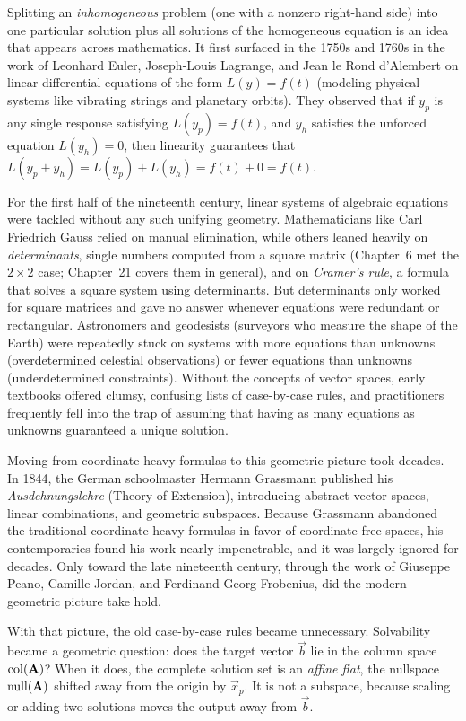 \begin{historybox}
Splitting an \emph{inhomogeneous} problem (one with a nonzero right-hand side) into one
particular solution plus all solutions of the homogeneous equation is an idea that appears
across mathematics. It first surfaced
in the 1750s and 1760s in the work of Leonhard Euler, Joseph-Louis Lagrange, and Jean le Rond
d'Alembert on linear differential equations of the form $L(y) = f(t)$ (modeling physical systems
like vibrating strings and planetary orbits). They observed that if $y_p$ is any single response
satisfying $L(y_p) = f(t)$, and $y_h$ satisfies the unforced equation $L(y_h) = 0$, then linearity
guarantees that $L(y_p + y_h) = L(y_p) + L(y_h) = f(t) + 0 = f(t)$.

For the first half of the nineteenth century, linear systems of algebraic equations were tackled
without any such unifying geometry. Mathematicians like Carl Friedrich Gauss relied on manual
elimination, while others leaned heavily on \emph{determinants}, single numbers computed
from a square matrix (Chapter~6 met the $2\times 2$ case; Chapter~21 covers them in general), and on \emph{Cramer's rule}, a formula
that solves a square system using determinants. But determinants
only worked for square matrices and gave no answer whenever equations were redundant or rectangular.
Astronomers and geodesists (surveyors who measure the shape of the Earth) were repeatedly stuck on systems with more equations than unknowns
(overdetermined celestial observations) or fewer equations than unknowns (underdetermined
constraints). Without the concepts of vector spaces, early textbooks offered clumsy, confusing
lists of case-by-case rules, and practitioners frequently fell into the trap of assuming that
having as many equations as unknowns guaranteed a unique solution.

Moving from coordinate-heavy formulas to this geometric picture took decades. In 1844, the German
schoolmaster Hermann Grassmann published his \emph{Ausdehnungslehre} (Theory of
Extension), introducing abstract vector spaces, linear combinations, and geometric subspaces.
Because Grassmann abandoned the traditional coordinate-heavy formulas in favor of coordinate-free
spaces, his contemporaries found his work nearly impenetrable, and it was largely ignored for
decades. Only toward the late nineteenth century, through the work of Giuseppe Peano, Camille
Jordan, and Ferdinand Georg Frobenius, did the modern geometric picture take hold.

With that picture, the old case-by-case rules became unnecessary. Solvability became a
geometric question: does the target vector $\vec{b}$ lie in the column space
$\operatorname{col}(\mathbf{A})$? When it does, the complete solution set is an \emph{affine flat}, the
nullspace $\operatorname{null}(\mathbf{A})$ shifted away from the origin by $\vec{x}_p$. It is not a
subspace, because scaling or adding two solutions moves the output away from $\vec{b}$.


\end{historybox}
